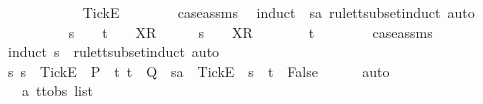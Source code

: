 \begin{isabellebody}
\ \ \ \ \isamarkupfalse%
\ {\isasymsigma}{\isacharprime}\ \ {\isachardoublequoteopen}{\isasymsigma}\ {\isacharequal}\ {\isasymsigma}{\isacharprime}\ {\isacharat}\ {\isacharbrackleft}{\isacharbrackleft}Tick{\isacharbrackright}\isactrlsub E{\isacharbrackright}{\isachardoublequoteclose}\isanewline
\ \ \ \ \ \ \isamarkupfalse%
\ case{\isacharunderscore}assms{\isacharparenleft}{}{\isacharparenright}\ \isamarkupfalse%
\ {\isacharparenleft}induct\ {\isasymrho}\ sa\ rule{\isacharcolon}tt{\isacharunderscore}subset{\isachardot}induct{\isacharcomma}\ auto{\isacharparenright}\isanewline
\ \ \ \ \isamarkupfalse%
\ {\isachardoublequoteopen}{\isacharparenleft}{\isasymexists}\ {\isasymrho}{}{\isachardot}\ {\isasymrho}\ {\isacharequal}\ s\ {\isacharat}\ {\isasymrho}{}\ {\isasymand}\ t\ {\isacharequal}\ {\isasymrho}{}\ {\isacharat}\ {\isacharbrackleft}X{\isacharbrackright}\isactrlsub R\ {\isacharhash}\ {\isasymsigma}{\isacharparenright}\ {\isasymor}\ {\isacharparenleft}{\isasymexists}\ {\isasymsigma}{}{\isachardot}\ s\ {\isacharequal}\ {\isasymrho}\ {\isacharat}\ {\isacharbrackleft}X{\isacharbrackright}\isactrlsub R\ {\isacharhash}\ {\isasymsigma}{}\ {\isasymand}\ {\isasymsigma}\ {\isacharequal}\ {\isasymsigma}{}\ {\isacharat}\ t{\isacharparenright}{\isachardoublequoteclose}\isanewline
\ \ \ \ \ \ \isamarkupfalse%
\ case{\isacharunderscore}assms{\isacharparenleft}{}{\isacharparenright}\ \isamarkupfalse%
\ {\isacharparenleft}induct\ s\ {\isasymrho}\ rule{\isacharcolon}tt{\isacharunderscore}subset{\isachardot}induct{\isacharcomma}\ auto{\isacharparenright}\isanewline
\ \ \ \ \isamarkupfalse%
\ \isamarkupfalse%
\ {\isachardoublequoteopen}{\isasymforall}s{\isachardot}\ s\ {\isacharat}\ {\isacharbrackleft}{\isacharbrackleft}Tick{\isacharbrackright}\isactrlsub E{\isacharbrackright}\ {\isasymin}\ P\ {\isasymlongrightarrow}\ {\isacharparenleft}{\isasymforall}t{\isachardot}\ t\ {\isasymin}\ Q\ {\isasymlongrightarrow}\ sa\ {\isacharat}\ {\isacharbrackleft}{\isacharbrackleft}Tick{\isacharbrackright}\isactrlsub E{\isacharbrackright}\ {\isasymnoteq}\ s\ {\isacharat}\ t{\isacharparenright}\ {\isasymLongrightarrow}\ False{\isachardoublequoteclose}\isanewline
\ \ \ \ \isamarkupfalse%
\ auto\isanewline
\ \ \ \ \ \ \isamarkupfalse%
\ {\isasymrho}{}\ {\isacharcolon}{\isacharcolon}\ {\isachardoublequoteopen}{\isacharprime}a\ ttobs\ list{\isachardoublequoteclose}\isanewline

\end{isabellebody}

